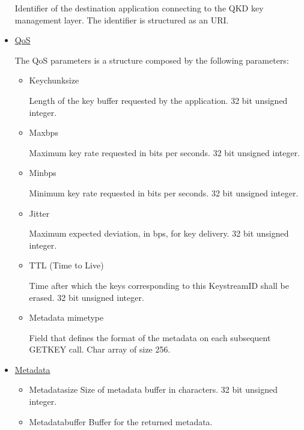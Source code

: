 \begin{refsection}
\begin{itemize}
		Identifier of the destination application connecting to the QKD key management layer. The identifier is structured as an URI.
		
	\item\underline{QoS}
	
		The QoS parameters is a structure composed by the following parameters:
		
		\begin{itemize}
			\item{Key\textunderscore chunk\textunderscore size}
				
				Length of the key buffer requested by the application. 32 bit unsigned integer.
				
			\item{Max\textunderscore bps}
			
				Maximum key rate requested in bits per seconds. 32 bit unsigned integer.
				
			\item{Min\textunderscore bps}
			
				Minimum key rate requested in bits per seconds. 32 bit unsigned integer.
				
			\item{Jitter}
				
				Maximum expected deviation, in bps, for key delivery. 32 bit unsigned integer.
				
			\item{TTL (Time to Live)}
			
				Time after which the keys corresponding to this Key\textunderscore stream\textunderscore ID shall be erased. 32 bit unsigned integer.
				
			\item{Metadata mimetype}
			
				Field that defines the format of the metadata on each subsequent GET\textunderscore KEY call. Char array of size 256.
				
		\end{itemize}
	
	\item\underline{Metadata}
		
		\begin{itemize}
			\item{Metadata\textunderscore size}
				Size of metadata buffer in characters. 32 bit unsigned integer.
				
			\item{Metadata\textunderscore buffer}
				Buffer for the returned metadata.


\end{itemize}
\end{itemize}
\end{refsection}
